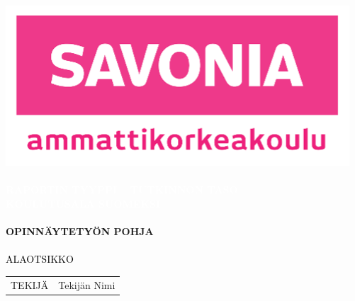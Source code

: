 \documentclass[a4paper, 11pt, oneside, finnish, includehead]{article}%
\author{\theauthor}
\title{\thetitle}
\newcommand{\theauthor}{Tekijän Nimi}
\newcommand{\thetitle}{Opinnäytetyön pohja}
\newcommand{\thesubtitle}{Alaotsikko}
\newcommand{\schoolfi}{Koulutusala suomeksi}
\begin{document}
\begin{titlepage}
  \hspace{-0.8cm}
  \includegraphics[scale=1]{savonia_ammattikorkeakoulu.png}\\[\bigskipamount]
  \noindent\makebox[\linewidth]{\textcolor{savoniamagenta}{  \hspace{-1cm}\rule{\paperwidth}{2cm}}}
  \vspace{-2.25cm}
  \textcolor{white}{
    \textbf{
      \large{\ \\ %
RAPORTIN TYYPPI -- TUTKINNON TASO\\[1.3ex]
\MakeUppercase{\schoolfi}\\
      }
    }
  }
  \vspace{2cm}
  \textcolor{savoniamagenta}{
    \textbf{
      \huge{  \ \\ %
\MakeUppercase{\thetitle}\\
      }
    }
  }
  \textcolor{black}{
    \large{\ \\ %
\MakeUppercase{\thesubtitle}\\[11.5cm]
    }
  }
  \begin{tabular}{ll}
TEKIJÄ
& \theauthor\\
  \end{tabular}
\end{titlepage}

\pagestyle{fancy}
\end{document}

